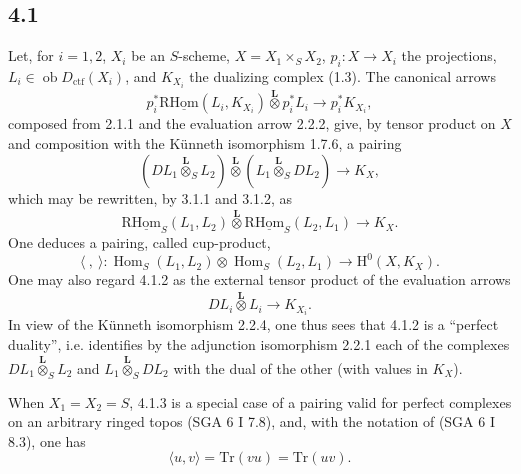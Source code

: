 \documentclass[11pt]{article}
\renewcommand{\H}{\mathrm{H}}
\DeclareMathOperator{\Hom}{Hom}
\newcommand{\ob}{\operatorname{ob}}
\providecommand{\Dctf}{D_{\mathrm{ctf}}}
\providecommand{\Dctf}{D_{\mathrm{ctf}}}
\providecommand{\Hom}{\operatorname{Hom}}
\providecommand{\ob}{\operatorname{ob}}
\providecommand{\Hom}{\operatorname{Hom}}
\begin{document}
\subsection*{4.1}
Let, for $i=1,2$, $X_i$ be an $S$-scheme, $X=X_1\times_SX_2$, $p_i:X\to X_i$ the projections, $L_i\in\ob\Dctf(X_i)$, and $K_{X_i}$ the dualizing complex (1.3). The canonical arrows
\begin{equation}
p_i^*\mathrm{R}\underline{\mathrm{Hom}}(L_i,K_{X_i})\overset{\mathbf L}{\otimes}p_i^*L_i
\longrightarrow p_i^*K_{X_i},
\tag{4.1.1}
\end{equation}
composed from 2.1.1 and the evaluation arrow 2.2.2, give, by tensor product on $X$ and composition with the Künneth isomorphism 1.7.6, a pairing
\begin{equation}
(DL_1\overset{\mathbf L}{\otimes}_S L_2)\overset{\mathbf L}{\otimes}(L_1\overset{\mathbf L}{\otimes}_S DL_2)
\longrightarrow K_X,
\tag{4.1.2}
\end{equation}
which may be rewritten, by 3.1.1 and 3.1.2, as
\begin{equation}
\mathrm{R}\underline{\mathrm{Hom}}_S(L_1,L_2)\overset{\mathbf L}{\otimes}\mathrm{R}\underline{\mathrm{Hom}}_S(L_2,L_1)
\longrightarrow K_X.
\tag{4.1.3}
\end{equation}
One deduces a pairing, called cup-product,
\begin{equation}
\langle\ ,\ \rangle:\Hom_S(L_1,L_2)\otimes\Hom_S(L_2,L_1)
\longrightarrow \H^0(X,K_X).
\tag{4.1.4}
\end{equation}
One may also regard 4.1.2 as the external tensor product of the evaluation arrows
\[
DL_i\overset{\mathbf L}{\otimes}L_i\longrightarrow K_{X_i}.
\]
In view of the Künneth isomorphism 2.2.4, one thus sees that 4.1.2 is a ``perfect duality'', i.e. identifies by the adjunction isomorphism 2.2.1 each of the complexes $DL_1\overset{\mathbf L}{\otimes}_S L_2$ and $L_1\overset{\mathbf L}{\otimes}_S DL_2$ with the dual of the other (with values in $K_X$).

When $X_1=X_2=S$, 4.1.3 is a special case of a pairing valid for perfect complexes on an arbitrary ringed topos (SGA 6 I 7.8), and, with the notation of (SGA 6 I 8.3), one has
\begin{equation}
\langle u,v\rangle=\mathrm{Tr}(vu)=\mathrm{Tr}(uv).
\tag{4.1.5}
\end{equation}
\end{document}
